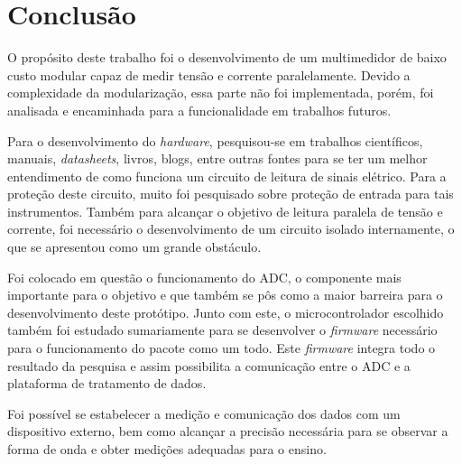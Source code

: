 \chapter{Conclusão}\label{cap:conclusoeseperspectivas}

O propósito deste trabalho foi o desenvolvimento de um multimedidor de baixo custo modular capaz de medir tensão e corrente paralelamente. Devido a complexidade da modularização, essa parte não foi implementada, porém, foi analisada e encaminhada para a funcionalidade em trabalhos futuros.

Para o desenvolvimento do \textit{hardware}, pesquisou-se em trabalhos científicos, manuais, \textit{datasheets}, livros, blogs, entre outras fontes para se ter um melhor entendimento de como funciona um circuito de leitura de sinais elétrico. Para a proteção deste circuito, muito foi pesquisado sobre proteção de entrada para tais instrumentos. Também para alcançar o objetivo de leitura paralela de tensão e corrente, foi necessário o desenvolvimento de um circuito isolado internamente, o que se apresentou como um grande obstáculo.

Foi colocado em questão o funcionamento do ADC, o componente mais importante para o objetivo e que também se pôs como a maior barreira para o desenvolvimento deste protótipo. Junto com este, o microcontrolador escolhido também foi estudado sumariamente para se desenvolver o \textit{firmware} necessário para o funcionamento do pacote como um todo. Este \textit{firmware} integra todo o resultado da pesquisa e assim possibilita a comunicação entre o ADC e a plataforma de tratamento de dados.

Foi possível se estabelecer a medição e comunicação dos dados com um dispositivo externo, bem como alcançar a precisão necessária para se observar a forma de onda e obter medições adequadas para o ensino.